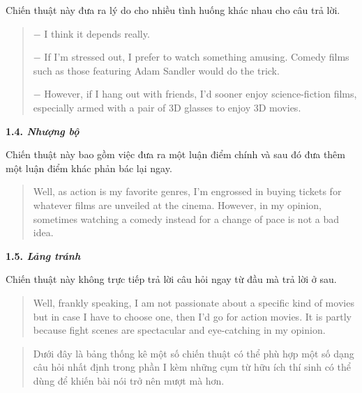 \vspace{.25cm}
Chiến thuật này đưa ra lý do cho nhiều tình huống khác nhau cho câu trả lời.  

\begin{quote}
$-$ I think it depends really.  

$-$ If I'm stressed out, I prefer to watch something amusing. Comedy films such as those featuring Adam Sandler would do the trick.  

$-$ However, if I hang out with friends, I'd sooner enjoy science-fiction films, especially armed with a pair of 3D glasses to enjoy 3D movies.  
\end{quote}

\bigskip
\textbf{1.4. \textit{Nhượng bộ}}  

\vspace{.25cm}
Chiến thuật này bao gồm việc đưa ra một luận điểm chính và sau đó đưa thêm một luận điểm khác phản bác lại ngay.  

\begin{quote}
Well, as action is my favorite genres, I'm engrossed in buying tickets for whatever films are unveiled at the cinema. However, in my opinion, sometimes watching a comedy instead for a change of pace is not a bad idea.  
\end{quote}

\bigskip
\textbf{1.5. \textit{Lảng tránh}}  

\vspace{.25cm}
Chiến thuật này không trực tiếp trả lời câu hỏi ngay từ đầu mà trả lời ở sau.  

\begin{quote}
Well, frankly speaking, I am not passionate about a specific kind of movies but in case I have to choose one, then I'd go for action movies. It is partly because fight scenes are spectacular and eye-catching in my opinion.  
\end{quote}
\vspace{.5cm}
\begin{quote}
    Dưới đây là bảng thống kê một số chiến thuật có thể phù hợp một số dạng câu hỏi nhất định trong phần I kèm những cụm từ hữu ích thí sinh có thể dùng để khiến bài nói trở nên mượt mà hơn.
\end{quote}

\renewcommand{\arraystretch}{1.3}

